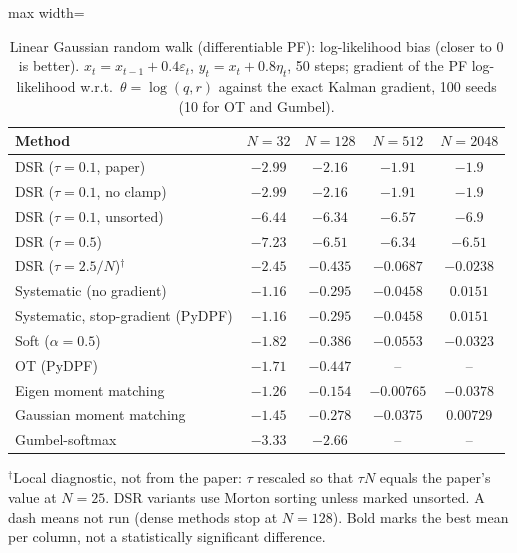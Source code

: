 \begin{table}[H]
\centering
\small
\caption{Linear Gaussian random walk (differentiable PF): log-likelihood bias (closer to 0 is better). $x_t=x_{t-1}+0.4\varepsilon_t$, $y_t=x_t+0.8\eta_t$, 50 steps; gradient of the PF log-likelihood w.r.t.\ $\theta=\log(q,r)$ against the exact Kalman gradient, 100 seeds (10 for OT and Gumbel).}
\label{tab:linear-native-loglik_bias}
\begin{adjustbox}{max width=\linewidth}
\begin{tabular}{lcccc}
\toprule
Method & $N{=}32$ & $N{=}128$ & $N{=}512$ & $N{=}2048$ \\
\midrule
DSR ($\tau{=}0.1$, paper) & $-2.99$ & $-2.16$ & $-1.91$ & $-1.9$ \\
DSR ($\tau{=}0.1$, no clamp) & $-2.99$ & $-2.16$ & $-1.91$ & $-1.9$ \\
DSR ($\tau{=}0.1$, unsorted) & $-6.44$ & $-6.34$ & $-6.57$ & $-6.9$ \\
DSR ($\tau{=}0.5$) & $-7.23$ & $-6.51$ & $-6.34$ & $-6.51$ \\
DSR ($\tau{=}2.5/N$)$^\dagger$ & $-2.45$ & $-0.435$ & $-0.0687$ & $-0.0238$ \\
\midrule
Systematic (no gradient) & $\mathbf{-1.16}$ & $-0.295$ & $-0.0458$ & $0.0151$ \\
Systematic, stop-gradient (PyDPF) & $\mathbf{-1.16}$ & $-0.295$ & $-0.0458$ & $0.0151$ \\
Soft ($\alpha{=}0.5$) & $-1.82$ & $-0.386$ & $-0.0553$ & $-0.0323$ \\
OT (PyDPF) & $-1.71$ & $-0.447$ & -- & -- \\
Eigen moment matching & $-1.26$ & $\mathbf{-0.154}$ & $\mathbf{-0.00765}$ & $-0.0378$ \\
Gaussian moment matching & $-1.45$ & $-0.278$ & $-0.0375$ & $\mathbf{0.00729}$ \\
Gumbel-softmax & $-3.33$ & $-2.66$ & -- & -- \\
\bottomrule
\end{tabular}
\end{adjustbox}
\par\smallskip\parbox{0.95\linewidth}{\footnotesize $^\dagger$Local diagnostic, not from the paper: $\tau$ rescaled so that $\tau N$ equals the paper's value at $N{=}25$. DSR variants use Morton sorting unless marked unsorted. A dash means not run (dense methods stop at $N{=}128$). Bold marks the best mean per column, not a statistically significant difference.}
\end{table}

